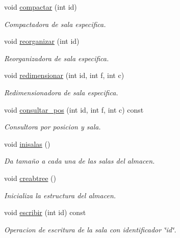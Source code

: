 \begin{DoxyCompactItemize}
void \hyperlink{class_almacen_a9b0a893ac5ea4774bd362e297b2c3770}{compactar} (int id)
\begin{DoxyCompactList}\small\item\em Compactadora de sala especifica. \end{DoxyCompactList}\item 
void \hyperlink{class_almacen_a9e27219c735096dab9d5d3edc2ae2012}{reorganizar} (int id)
\begin{DoxyCompactList}\small\item\em Reorganizadora de sala especifica. \end{DoxyCompactList}\item 
void \hyperlink{class_almacen_a477373756d8671d1acef1c7d84a926a9}{redimensionar} (int id, int f, int c)
\begin{DoxyCompactList}\small\item\em Redimensionadora de sala especifica. \end{DoxyCompactList}\item 
void \hyperlink{class_almacen_af3a411fa6f4e0d5b327697bdcd08c41c}{consultar\+\_\+pos} (int id, int f, int c) const 
\begin{DoxyCompactList}\small\item\em Consultora por posicion y sala. \end{DoxyCompactList}\item 
void \hyperlink{class_almacen_a4ed23c4daa30f40be6fb8986ab04cbef}{inisalas} ()
\begin{DoxyCompactList}\small\item\em Da tamaño a cada una de las salas del almacen. \end{DoxyCompactList}\item 
void \hyperlink{class_almacen_aee1a1a170d9712b5988692cb93791a4c}{creabtree} ()
\begin{DoxyCompactList}\small\item\em Inicializa la estructura del almacen. \end{DoxyCompactList}\item 
void \hyperlink{class_almacen_a139a466ffe4ed01057a19607e1c4d437}{escribir} (int id) const 
\begin{DoxyCompactList}\small\item\em Operacion de escritura de la sala con identificador \char`\"{}id\char`\"{}. \end{DoxyCompactList}\end{DoxyCompactItemize}
